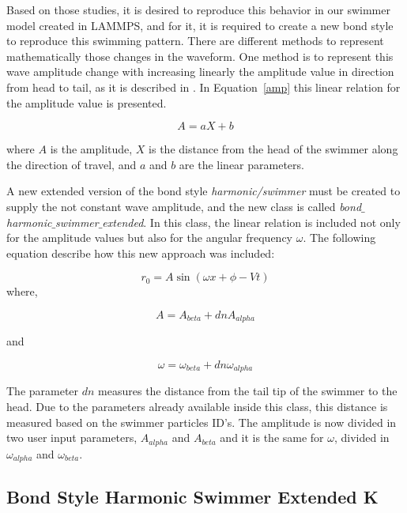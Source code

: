 Based on those studies, it is desired to reproduce this behavior in our swimmer model created in LAMMPS, and for it, it is required to create a new bond style to reproduce this swimming
pattern. There are different methods to represent mathematically those changes in the waveform. One method is to represent this wave amplitude change with increasing linearly the 
amplitude value in direction from head to tail, as it is described in \cite{jayne_swimming_1985}. In Equation~\ref{amp} this linear relation for the amplitude value is presented.

\begin{equation}\label{amp}
  A = a X + b
\end{equation}

where $A$ is the amplitude, $X$ is the distance from the head of the swimmer along the direction of travel, and $a$ and $b$ are the linear parameters.\par

A new extended version of the bond style \textit{harmonic/swimmer} must be created to supply the not constant wave amplitude, and the new class is called
\textit{bond$\_$harmonic$\_$swimmer$\_$extended}. In this class, the linear relation is included not only for the amplitude values but also for the angular frequency $\omega$.
The following equation describe how this new approach was included:

\begin{equation}
 r_{0} = A  \sin (\omega x + \phi - Vt)
\end{equation}
 where,
 
\begin{equation}
 A = A_{beta} + dn A_{alpha}
\end{equation}

and
 
\begin{equation}
 \omega = \omega_{beta} + dn \omega_{alpha}
\end{equation}

The parameter $dn$ measures the distance from the tail tip of the swimmer to the head. Due to the parameters already available inside this class, this distance is measured based
on the swimmer particles ID's. The amplitude is now divided in two user input parameters, $A_{alpha}$ and $A_{beta}$ and it is the same for $\omega$, divided in $\omega_{alpha}$
and $\omega_{beta}$.\par


\subsection{Bond Style Harmonic Swimmer Extended K}
\label{sec:section 2}

